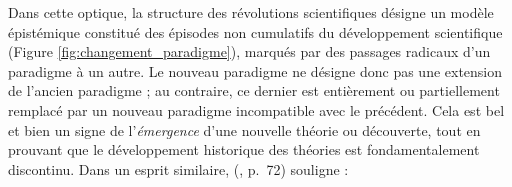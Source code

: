 Dans cette optique, la structure des révolutions scientifiques désigne un modèle épistémique constitué des épisodes non cumulatifs du développement scientifique (Figure \ref{fig:changement_paradigme}), marqués par des passages radicaux d'un paradigme à un autre.  Le nouveau paradigme ne désigne donc pas une extension de l'ancien paradigme ; au contraire, ce dernier est entièrement ou partiellement remplacé par un nouveau paradigme incompatible avec le précédent. 
Cela est bel et bien un signe de l'\textit{émergence} d'une nouvelle théorie ou découverte, tout en prouvant que le développement historique des théories est fondamentalement discontinu. Dans un esprit similaire, \citeauthor{bachelard1970idealisme} (\citeyear{bachelard1970idealisme}, p.~72) souligne :


%

